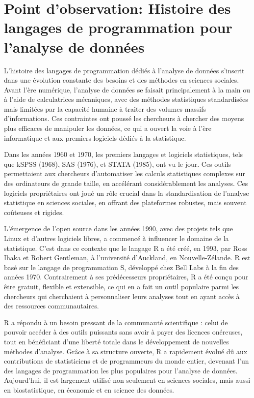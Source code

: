 \documentclass[
  letterpaper,
  DIV=11,
  numbers=noendperiod]{scrreprt}
\begin{document}
\hypertarget{point-dobservation-histoire-des-langages-de-programmation-pour-lanalyse-de-donnuxe9es}{%
\section{Point d'observation: Histoire des langages de programmation
pour l'analyse de
données}\label{point-dobservation-histoire-des-langages-de-programmation-pour-lanalyse-de-donnuxe9es}}

L'histoire des langages de programmation dédiés à l'analyse de données
s'inscrit dans une évolution constante des besoins et des méthodes en
sciences sociales. Avant l'ère numérique, l'analyse de données se
faisait principalement à la main ou à l'aide de calculatrices
mécaniques, avec des méthodes statistiques standardisées mais limitées
par la capacité humaine à traiter des volumes massifs d'informations.
Ces contraintes ont poussé les chercheurs à chercher des moyens plus
efficaces de manipuler les données, ce qui a ouvert la voie à l'ère
informatique et aux premiers logiciels dédiés à la statistique.

Dans les années 1960 et 1970, les premiers langages et logiciels
statistiques, tels que kSPSS (1968), SAS (1976), et STATA (1985), ont vu
le jour. Ces outils permettaient aux chercheurs d'automatiser les
calculs statistiques complexes sur des ordinateurs de grande taille, en
accélérant considérablement les analyses. Ces logiciels propriétaires
ont joué un rôle crucial dans la standardisation de l'analyse
statistique en sciences sociales, en offrant des plateformes robustes,
mais souvent coûteuses et rigides.

L'émergence de l'open source dans les années 1990, avec des projets tels
que Linux et d'autres logiciels libres, a commencé à influencer le
domaine de la statistique. C'est dans ce contexte que le langage R a été
créé, en 1993, par Ross Ihaka et Robert Gentleman, à l'université
d'Auckland, en Nouvelle-Zélande. R est basé sur le langage de
programmation S, développé chez Bell Labs à la fin des années 1970.
Contrairement à ses prédécesseurs propriétaires, R a été conçu pour être
gratuit, flexible et extensible, ce qui en a fait un outil populaire
parmi les chercheurs qui cherchaient à personnaliser leurs analyses tout
en ayant accès à des ressources communautaires.

R a répondu à un besoin pressant de la communauté scientifique : celui
de pouvoir accéder à des outils puissants sans avoir à payer des
licences onéreuses, tout en bénéficiant d'une liberté totale dans le
développement de nouvelles méthodes d'analyse. Grâce à sa structure
ouverte, R a rapidement évolué dû aux contributions de statisticiens et
de programmeurs du monde entier, devenant l'un des langages de
programmation les plus populaires pour l'analyse de données.
Aujourd'hui, il est largement utilisé non seulement en sciences
sociales, mais aussi en biostatistique, en économie et en science des
données.
\end{document}
